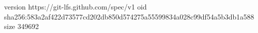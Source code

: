 version https://git-lfs.github.com/spec/v1
oid sha256:583a2af422d73577cd202db850d574275a55599834a028c99df54a5b3db1a588
size 349692
